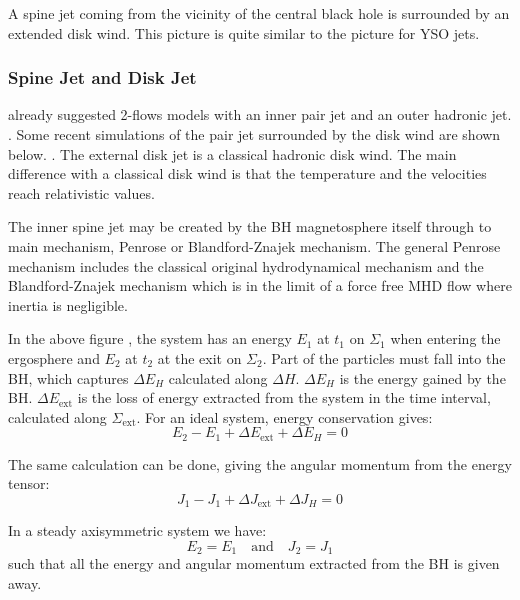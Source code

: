 \documentclass[10pt,a4paper,english]{article}
\begin{document}
A spine jet coming from the vicinity of the central black hole is surrounded by
an extended disk wind. This picture is quite similar to the picture for YSO
jets.

\subsubsection{Spine Jet and Disk Jet}

\cite{1989MNRAS.237..411S} already suggested 2-flows models with an inner pair
jet and an outer hadronic jet. . Some recent simulations of the pair jet surrounded by the disk wind are
shown below. . The external disk jet is a
classical hadronic disk wind. The main difference with a classical disk wind is
that the temperature and the velocities reach relativistic values.

The inner spine jet may be created by the BH magnetosphere itself through to
main mechanism, Penrose or Blandford-Znajek mechanism. The general Penrose
mechanism includes the classical original hydrodynamical mechanism and the
Blandford-Znajek mechanism which is in the limit of a force free MHD flow where
inertia is negligible. 

In the above figure , the system has an energy $E_1$ at $t_1$ on
$\Sigma_1$ when entering the ergosphere and $E_2$ at $t_2$ at the exit on
$\Sigma_2$. Part of the particles must fall into the BH, which captures $\Delta
E_H$ calculated along $\Delta H$. $\Delta E_H$ is the energy gained by the BH.
$\Delta E_\mathrm{ext}$ is the loss of energy extracted from the system in the
time interval, calculated along $\Sigma_\mathrm{ext}$. For an ideal system,
energy conservation gives:
\begin{equation}
    E_2 - E_1 + \Delta E_\mathrm{ext} + \Delta E_H = 0
\end{equation}

The same calculation can be done, giving the angular momentum from the energy
tensor:
\begin{equation}
    J_1 - J_1 + \Delta J_\mathrm{ext} + \Delta J_H = 0
\end{equation}

In a steady axisymmetric system we have:
\begin{equation}
    E_2 = E_1 \quad \textrm{and} \quad J_2 = J_1
\end{equation}
such that all the energy and angular momentum extracted from the BH is given
away.
\end{document}
